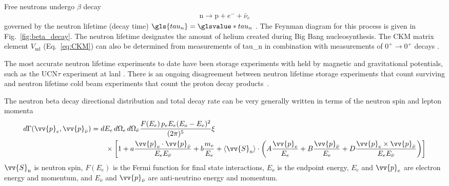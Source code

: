 Free neutrons undergo $\beta$ decay
%
\begin{gather}
    \text{n}\rightarrow \text{p}+ e^-+\bar{\nu}_e
\end{gather}
%
governed by the neutron lifetime (decay time) $\gls{tau_n}=\glsvalue*{tau_n}$ \cite{pdg2022}. The Feynman diagram for this process is given in Fig.~\ref{fig:beta_decay}. The neutron lifetime designates the amount of helium created during Big Bang nucleosynthesis. The CKM matrix element $V_\text{ud}$ (Eq.~\ref{eq:CKM}) can also be determined from measurements of \gls{tau_n} in combination with measurements of $0^+\rightarrow0^+$ decays \cite{Young2014}.

The most accurate neutron lifetime experiments to date have been storage experiments with \ucn held by magnetic and gravitational potentials, such as the UCN$\tau$ experiment at \acrshort{lanl} \cite{gonzalez_ucn_tau}. There is an ongoing disagreement between neutron lifetime storage experiments that count surviving \ucn and neutron lifetime cold beam experiments that count the proton decay products~\cite{czarnecki2018}.

The neutron beta decay directional distribution and total decay rate can be very generally written in terms of the neutron spin and lepton momenta \cite{Young2014}
%
\begin{align}
    d\Gamma(\vv{p}_e, \vv{p}_{\bar{\nu}}) &= dE_e\,d\Omega_e \,d\Omega_{\bar{\nu}} \frac{F(E_e)\,p_e E_e (E_o-E_e)^2}{(2\pi)^5} \xi \nonumber \\
    &\quad\quad \times \left[1 + a\frac{\vv{p}_e \cdot \vv{p}_{\bar{\nu}}}{E_e E_{\bar{\nu}}}
    +b\frac{m_e}{E_e} + \langle \vv{S}_\text{n} \rangle \cdot
    \left( A\frac{\vv{p}_e}{E_e} + B \frac{\vv{p}_{\bar{\nu}}}{E_e} + D\frac{\vv{p}_e\times \vv{p}_{\bar{\nu}}}{E_e E_{\bar{\nu}}}
    \right) \right]
\end{align}
%
$\vv{S}_\text{n}$ is neutron spin, $F(E_e)$ is the Fermi function for final state interactions, $E_o$ is the endpoint energy, $E_e$ and $\vv{p}_e$ are electron energy and momentum, and $E_{\bar{\nu}}$ and $\vv{p}_{\bar{\nu}}$ are anti-neutrino energy and momentum.

